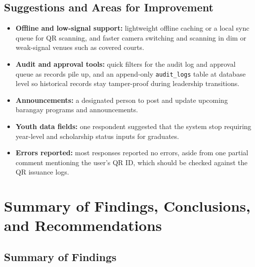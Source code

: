 \subsection{Suggestions and Areas for Improvement}
\label{subsec:suggestions_and_areas_for_improvement}

\begin{itemize}
    \item \textbf{Offline and low-signal support:} lightweight offline caching or a local sync queue for QR scanning, and faster camera switching and scanning in dim or weak-signal venues such as covered courts.
    \item \textbf{Audit and approval tools:} quick filters for the audit log and approval queue as records pile up, and an append-only \texttt{audit\_logs} table at database level so historical records stay tamper-proof during leadership transitions.
    \item \textbf{Announcements:} a designated person to post and update upcoming barangay programs and announcements.
    \item \textbf{Youth data fields:} one respondent suggested that the system stop requiring year-level and scholarship status inputs for graduates.
    \item \textbf{Errors reported:} most responses reported no errors, aside from one partial comment mentioning the user's QR ID, which should be checked against the QR issuance logs.
\end{itemize}
\vspace{5mm}

\section{Summary of Findings, Conclusions, and Recommendations}
\label{sec:summary_of_findings_conclusions_and_recommendations}

\subsection{Summary of Findings}
\label{subsec:summary_of_findings}

